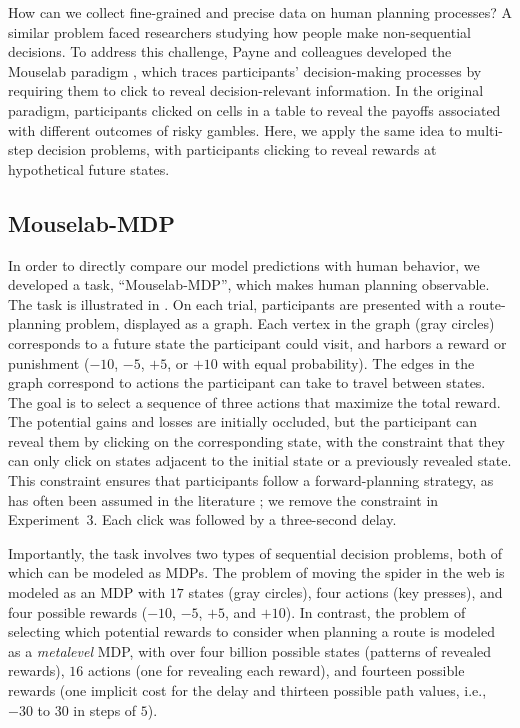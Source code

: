 How can we collect fine-grained and precise data on human planning processes? A similar problem faced researchers studying how people make non-sequential decisions. To address this challenge, Payne and colleagues developed the Mouselab paradigm \citep{payne1976task,payne1988adaptive}, which traces participants' decision-making processes by requiring them to click to reveal decision-relevant information. In the original paradigm, participants clicked on cells in a table to reveal the payoffs associated with different outcomes of risky gambles. Here, we apply the same idea to multi-step decision problems, with participants clicking to reveal rewards at hypothetical future states.

\subsection{Mouselab-MDP}\label{sec:planning-task}

In order to directly compare our model predictions with human behavior, we developed a task, ``Mouselab-MDP'', which makes human planning observable. The task is illustrated in . On each trial, participants are presented with a route-planning problem, displayed as a graph. Each vertex in the graph (gray circles) corresponds to a future state the participant could visit, and harbors a reward or punishment ($-10$, $-5$, $+5$, or $+10$ with equal probability). The edges in the graph correspond to actions the participant can take to travel between states. The goal is to select a sequence of three actions that maximize the total reward. The potential gains and losses are initially occluded, but the participant can reveal them by clicking on the corresponding state, with the constraint that they can only click on states adjacent to the initial state or a previously revealed state. This constraint ensures that participants follow a forward-planning strategy, as has often been assumed in the literature \citep{huys2015interplay,huys2012bonsai,vanopheusden2017computational,macgregor2001information,keramati2016adaptive,krusche2018adaptive,snider2015prospective}; we remove the constraint in Experiment~3. Each click was followed by a three-second delay.

Importantly, the task involves two types of sequential decision problems, both of which can be modeled as MDPs. The problem of moving the spider in the web is modeled as an MDP with $17$ states (gray circles), four actions (key presses), and four possible rewards ($-10$, $-5$, $+5$, and $+10$). In contrast, the problem of selecting which potential rewards to consider when planning a route is modeled as a \emph{metalevel} MDP, with over four billion possible states (patterns of revealed rewards), $16$ actions (one for revealing each reward), and fourteen possible rewards (one implicit cost for the delay and thirteen possible path values, i.e., $-30$ to $30$ in steps of $5$).

